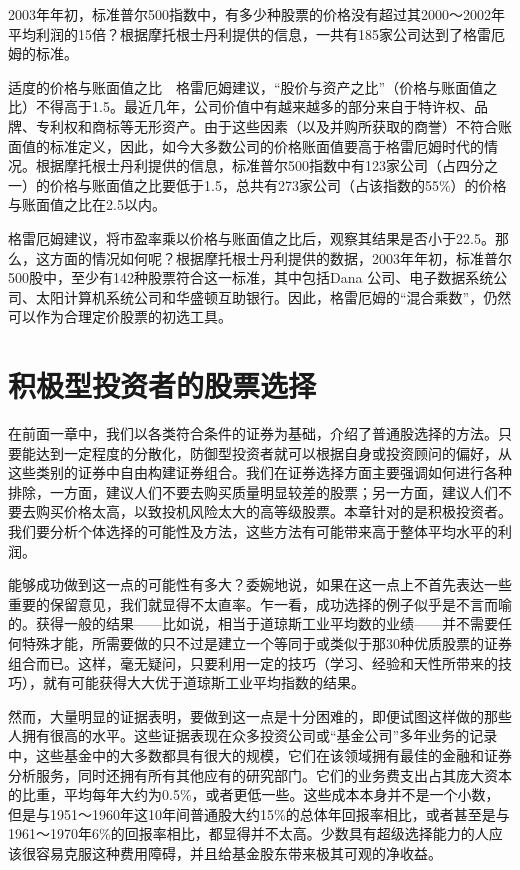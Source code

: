 \documentclass[12pt,oneside]{book}
\begin{document}
2003年年初，标准普尔500指数中，有多少种股票的价格没有超过其2000～2002年平均利润的15倍？根据摩托根士丹利提供的信息，一共有185家公司达到了格雷厄姆的标准。

适度的价格与账面值之比　格雷厄姆建议，“股价与资产之比”（价格与账面值之比）不得高于1.5。最近几年，公司价值中有越来越多的部分来自于特许权、品牌、专利权和商标等无形资产。由于这些因素（以及并购所获取的商誉）不符合账面值的标准定义，因此，如今大多数公司的价格账面值要高于格雷厄姆时代的情况。根据摩托根士丹利提供的信息，标准普尔500指数中有123家公司（占四分之一）的价格与账面值之比要低于1.5，总共有273家公司（占该指数的55\%）的价格与账面值之比在2.5以内。

格雷厄姆建议，将市盈率乘以价格与账面值之比后，观察其结果是否小于22.5。那么，这方面的情况如何呢？根据摩托根士丹利提供的数据，2003年年初，标准普尔500股中，至少有142种股票符合这一标准，其中包括Dana 公司、电子数据系统公司、太阳计算机系统公司和华盛顿互助银行。因此，格雷厄姆的“混合乘数”，仍然可以作为合理定价股票的初选工具。

\section{积极型投资者的股票选择}
在前面一章中，我们以各类符合条件的证券为基础，介绍了普通股选择的方法。只要能达到一定程度的分散化，防御型投资者就可以根据自身或投资顾问的偏好，从这些类别的证券中自由构建证券组合。我们在证券选择方面主要强调如何进行各种排除，一方面，建议人们不要去购买质量明显较差的股票；另一方面，建议人们不要去购买价格太高，以致投机风险太大的高等级股票。本章针对的是积极投资者。我们要分析个体选择的可能性及方法，这些方法有可能带来高于整体平均水平的利润。

能够成功做到这一点的可能性有多大？委婉地说，如果在这一点上不首先表达一些重要的保留意见，我们就显得不太直率。乍一看，成功选择的例子似乎是不言而喻的。获得一般的结果——比如说，相当于道琼斯工业平均数的业绩——并不需要任何特殊才能，所需要做的只不过是建立一个等同于或类似于那30种优质股票的证券组合而已。这样，毫无疑问，只要利用一定的技巧（学习、经验和天性所带来的技巧），就有可能获得大大优于道琼斯工业平均指数的结果。

然而，大量明显的证据表明，要做到这一点是十分困难的，即便试图这样做的那些人拥有很高的水平。这些证据表现在众多投资公司或“基金公司”多年业务的记录中，这些基金中的大多数都具有很大的规模，它们在该领域拥有最佳的金融和证券分析服务，同时还拥有所有其他应有的研究部门。它们的业务费支出占其庞大资本的比重，平均每年大约为0.5\%，或者更低一些。这些成本本身并不是一个小数，但是与1951～1960年这10年间普通股大约15\%的总体年回报率相比，或者甚至是与1961～1970年6\%的回报率相比，都显得并不太高。少数具有超级选择能力的人应该很容易克服这种费用障碍，并且给基金股东带来极其可观的净收益。
\end{document}
